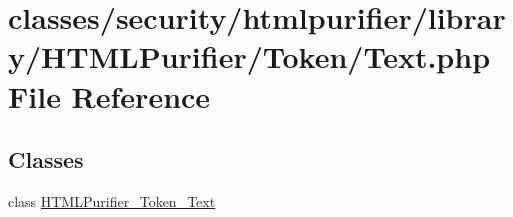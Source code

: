 \hypertarget{Token_2Text_8php}{\section{classes/security/htmlpurifier/library/\+H\+T\+M\+L\+Purifier/\+Token/\+Text.php File Reference}
\label{Token_2Text_8php}
}
\subsection*{Classes}
\begin{DoxyCompactItemize}
\item 
class \hyperlink{classHTMLPurifier__Token__Text}{H\+T\+M\+L\+Purifier\+\_\+\+Token\+\_\+\+Text}
\end{DoxyCompactItemize}
